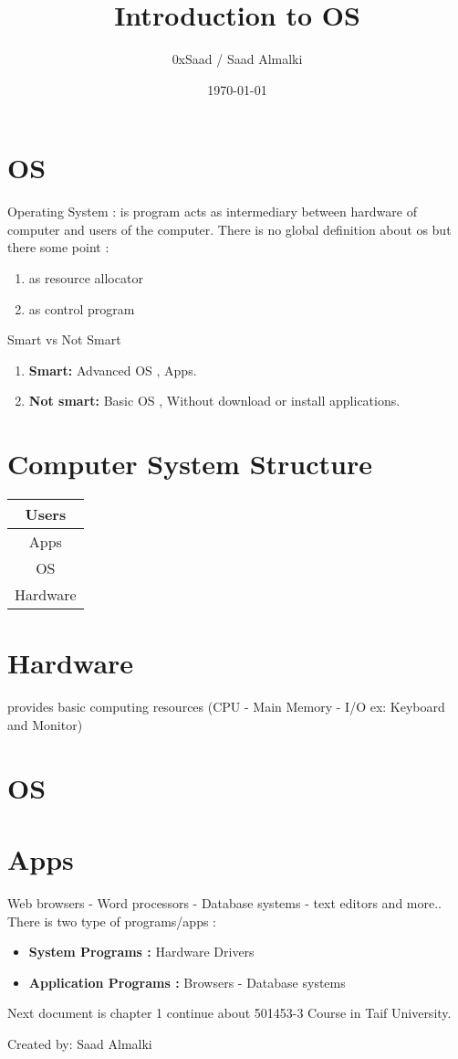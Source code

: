 \documentclass[12pt]{article}
\title{Introduction to OS}
\author{0xSaad / Saad Almalki}
\date{\today}
\begin{document}
\maketitle

\section{OS}
Operating System : is program acts as intermediary between hardware of computer and users of the computer.
There is no global definition about os but there some point :
\begin{enumerate}
  \item as resource allocator
  \item as control program
\end{enumerate}

Smart vs Not Smart
\begin{enumerate}
    \item \textbf{Smart:} Advanced OS , Apps.
    \item \textbf{Not smart:} Basic OS , Without download or install applications.
\end{enumerate}

\section{Computer System Structure}

\begin{tabular}{|c|}
\hline
Users \\ \hline
Apps \\ \hline
OS \\ \hline
Hardware \\ \hline
\end{tabular}



\section{Hardware}
provides basic computing resources (CPU - Main Memory - I/O ex: Keyboard and Monitor)
\section{OS}

\section{Apps}
Web browsers - Word processors - Database systems - text editors and more..
There is two type of programs/apps :

\begin{itemize}
    \item \textbf{System Programs : } Hardware Drivers
    \item \textbf{Application Programs : } Browsers - Database systems
\end{itemize}

Next document is chapter 1 continue about 501453-3 Course in Taif University.

\begin{flushright}
Created by: Saad Almalki \\
\end{flushright}
\end{document}
